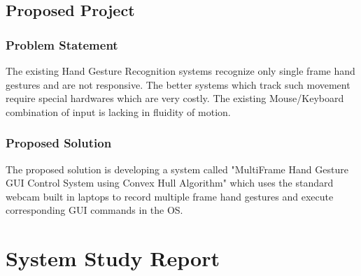 \documentclass[11pt]{report}
\begin{document}
\section{Proposed Project}

\subsection{Problem Statement}

The existing Hand Gesture Recognition systems recognize only single frame hand gestures and are not 
responsive. The better systems which track such movement require special hardwares which are very costly.
The existing Mouse/Keyboard combination of input is lacking in fluidity of motion.

\subsection{Proposed Solution}
The proposed solution is developing a system called "MultiFrame Hand Gesture GUI Control System using Convex Hull Algorithm"
which uses the standard webcam built in laptops to record multiple frame hand gestures and execute corresponding GUI commands in the OS.


\chapter{System Study Report}
\end{document}
